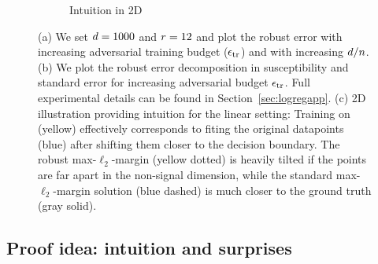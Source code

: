 \begin{figure}[!t]
\begin{subfigure}[b]{0.32\textwidth}
  \caption{Intuition in 2D}
  \label{fig:2D_dataset_intuition}
\end{subfigure}
\caption{(a) We set $d=1000$ and $r = 12$ and plot the robust error with increasing adversarial training budget ($\epsilon_{\text{tr}}$) and with increasing $d/n$.  (b) We plot the robust error decomposition in susceptibility and standard error for increasing adversarial budget $\epsilon_{\text{tr}}$. 
  Full experimental details can be found in Section~\ref{sec:logregapp}. (c) 2D illustration providing intuition for the linear setting: Training on \nameofattacks (yellow) effectively corresponds to fiting the original datapoints (blue) after shifting them closer to the decision boundary. The robust max-$\ell_2$-margin (yellow dotted) is heavily tilted if the points are far apart in the non-signal dimension, while the standard max-$\ell_2$-margin solution (blue dashed) is much closer to the ground truth (gray solid). }
\label{fig:lineartradeoff}
\end{figure}

\subsection{Proof idea: intuition and surprises}
\label{logreg_proof_sketch}

